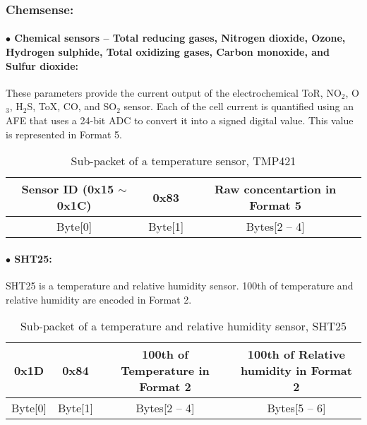 
\subsubsection{Chemsense:}

\paragraph{$\bullet$ Chemical sensors -- Total reducing gases, Nitrogen dioxide, Ozone, Hydrogen sulphide, Total oxidizing gases, Carbon monoxide, and Sulfur dioxide:}
These parameters provide the current output of the electrochemical ToR, NO$_2$, O$_3$, H$_2$S, ToX, CO, and SO$_2$ sensor.
Each of the cell current is quantified using an AFE that uses a
24-bit ADC to convert it into a signed digital value. This value is
represented in Format 5.

\begin{table}[h!]
    \centering
    \caption{Sub-packet of a temperature sensor, TMP421}
    \begin{tabular}{|c|c|c|}
        \hline
        \rowcolor{black!8}
        \textbf{Sensor ID} (0x15 $\sim$ 0x1C) & \textbf{0x83} & \textbf{Raw concentartion in Format 5}\\
        \hline
        Byte[0] & Byte[1] & Bytes[2 -- 4] \\ \hline
    \end{tabular}
\end{table}


\paragraph{$\bullet$ SHT25:}

SHT25 is a temperature and relative humidity sensor. 100th of temperature and relative humidity are
encoded in Format 2.

\begin{table}[h!]
    \centering
    \caption{Sub-packet of a temperature and relative humidity sensor, SHT25}
    \begin{tabular}{|c|c|c|c|}
        \hline
        \rowcolor{black!8}
        \textbf{0x1D} & \textbf{0x84} & \textbf{100th of Temperature in Format 2} & \textbf{100th of Relative humidity in Format 2}\\
        \hline
        Byte[0] & Byte[1] & Bytes[2 -- 4] & Bytes[5 -- 6] \\ \hline
    \end{tabular}
\end{table}



